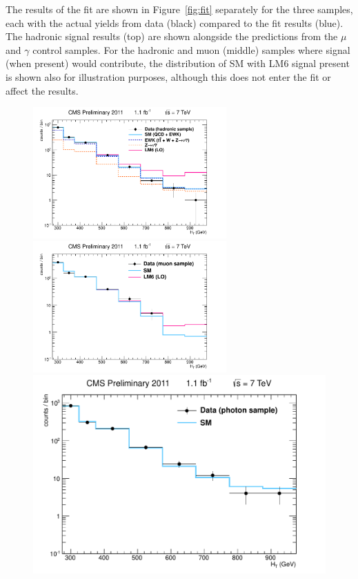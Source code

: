 The results of the fit are shown in Figure~\ref{fig:fit} separately for the three samples, each with the actual yields from data (black) compared to the fit results (blue). The hadronic signal results (top) are shown alongside the predictions from the $\mu$ and $\gamma$ control samples. For the hadronic and muon (middle) samples where signal (when present) would contribute, the distribution of SM with LM6 signal present is shown also for illustration purposes, although this does not enter the fit or affect the results. 

 \begin{figure}[htbp]
   \begin{center}

\includegraphics[width = 0.66\textwidth]{Figures/Analysis/PAS/stats_plots/RQcdFallingExp/hadronic_signal_fit_logy.pdf}
\includegraphics[width = 0.66\textwidth]{Figures/Analysis/PAS/stats_plots/RQcdFallingExp/muon_control_fit_logy.pdf}
\includegraphics[width = 0.66 \textwidth]{Figures/Analysis/PAS/stats_plots/RQcdFallingExp/photon_control_fit_logy.pdf} 
         

\end{center}
\end{figure}
